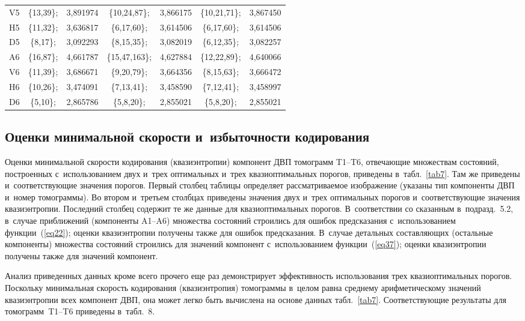\begin{multicols}{2}
\begin{table*}[b]
\begin{center}
\begin{tabular}{|c|cc|cc|cc|}
V5 & \{13,39\}; &  3,891974 & \{10,24,87\}; &  3,866175 & \{10,21,71\}; &  3,867450\\
H5 & \{11,32\}; &  3,636817 & \{6,17,60\}; &  3,614506 & \{6,17,60\}; &  3,614506\\
D5 & \{8,17\}; &  3,092293 & \{8,15,35\}; &  3,082019 & \{6,12,35\}; &  3,082257\\
A6 & \{16,87\}; &  4,661787 &\{15,47,163\}; &  4,627884 & \{12,22,89\}; &  4,640066\\
V6 & \{11,39\}; &  3,686671 &\{9,20,79\}; &  3,664356 & \{8,15,63\}; &  3,666472\\
H6 & \{10,26\}; &  3,474091 &\{7,13,41\}; &  3,458590 & \{7,12,41\}; &  3,458997\\
D6 & \{5,10\}; &  2,865786 & \{5,8,20\}; &  2,855021 & \{5,8,20\}; &  2,855021\\
\hline
\end{tabular}
\end{center}
\end{table*}

\subsection{Оценки минимальной скорости и~избыточности кодирования}


Оценки минимальной скорости кодирования (квазиэнтропии) компонент 
ДВП томограмм T1--T6, отвечающие множествам состояний, построенных 
с~использованием двух и~трех оптимальных и~трех квазиоптимальных порогов, 
приведены в~табл.~\ref{tab7}. Там же приведены и~соответствующие значения 
порогов. Первый столбец таблицы определяет рассматриваемое изображение 
(указаны тип компоненты ДВП и~номер томограммы). Во втором и~третьем столбцах 
приведены значения двух и~трех оптимальных порогов и~соответствующие значения 
квазиэнтропии. Последний столбец содержит те же данные для квазиоптимальных 
порогов. В~соответствии со сказанным в~подразд.~5.2, в~случае 
приближений (компоненты A1--A6) множества состояний строились для ошибок 
предсказания с~использованием функции~(\ref{eq22}); оценки квазиэнтропии 
получены также для ошибок предсказания. В~случае детальных составляющих 
(остальные компоненты) множества состояний строились для значений компонент 
с~использованием функции~(\ref{eq37}); оценки квазиэнтропии получены также 
для значений компонент.

Анализ приведенных данных кроме всего прочего еще раз демонстрирует 
эффективность использования трех квазиоптимальных порогов.
%
Поскольку минимальная скорость кодирования (квазиэнтропия) томограммы 
в~целом равна среднему арифметическому значений квазиэнтропии всех компонент ДВП, 
она может легко быть вычислена на основе данных табл.~\ref{tab7}. Соответст\-ву\-ющие 
результаты для томограмм~T1--T6 приведены в~табл.~8.


\end{multicols}

